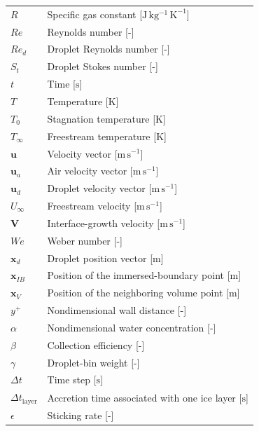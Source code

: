 \begin{longtable}{lp{5in}}
$R$                          & Specific gas constant [$\mathrm{J\,kg^{-1}\,K^{-1}}$]\\
$Re$                         & Reynolds number [-]\\
$Re_d$                       & Droplet Reynolds number [-]\\
$S_t$                        & Droplet Stokes number [-]\\
$t$                          & Time [$\mathrm{s}$]\\
$T$                          & Temperature [$\mathrm{K}$]\\
$T_0$                        & Stagnation temperature [$\mathrm{K}$]\\
$T_\infty$                   & Freestream temperature [$\mathrm{K}$]\\
$\boldsymbol{u}$             & Velocity vector [$\mathrm{m\,s^{-1}}$]\\
$\boldsymbol{u}_a$           & Air velocity vector [$\mathrm{m\,s^{-1}}$]\\
$\boldsymbol{u}_d$           & Droplet velocity vector [$\mathrm{m\,s^{-1}}$]\\
$U_\infty$                   & Freestream velocity [$\mathrm{m\,s^{-1}}$]\\
$\boldsymbol{V}$             & Interface-growth velocity [$\mathrm{m\,s^{-1}}$]\\
$We$                         & Weber number [-]\\
$\boldsymbol{x}_d$           & Droplet position vector [$\mathrm{m}$]\\
$\boldsymbol{x}_{IB}$        & Position of the immersed-boundary point [$\mathrm{m}$]\\
$\boldsymbol{x}_{V}$         & Position of the neighboring volume point [$\mathrm{m}$]\\
$y^+$                        & Nondimensional wall distance [-]\\
$\alpha$                     & Nondimensional water concentration [-]\\
$\beta$                      & Collection efficiency [-]\\
$\gamma$                     & Droplet-bin weight [-]\\
$\Delta t$                   & Time step [$\mathrm{s}$]\\
$\Delta t_{\mathrm{layer}}$  & Accretion time associated with one ice layer [$\mathrm{s}$]\\
$\epsilon$                   & Sticking rate [-]\\

\end{longtable}
